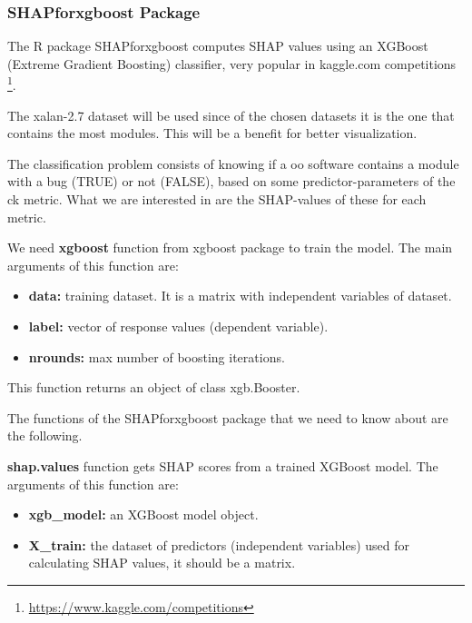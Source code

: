 \subsubsection{SHAPforxgboost Package}
\label{sec:shap-package}

The R package SHAPforxgboost computes SHAP values using an XGBoost (Extreme Gradient Boosting) classifier, very popular in kaggle.com competitions \footnote{\url{https://www.kaggle.com/competitions}}.

The xalan-2.7 dataset will be used since of the chosen datasets it is the one that contains the most modules. This will be a benefit for better visualization.

The classification problem consists of knowing if a \acrshort{oo} software contains a module with a bug (TRUE) or not (FALSE), based on some predictor-parameters of the \acrshort{ck} metric. What we are interested in are the SHAP-values of these for each metric.

We need \textbf{xgboost} function from xgboost package to train the model. The main arguments of this function are:

\begin{itemize}
    \item \textbf{data:} training dataset. It is a matrix with independent variables of dataset.
    
    \item \textbf{label:} vector of response values (dependent variable).
    
    \item \textbf{nrounds:} max number of boosting iterations.
\end{itemize}

This function returns an object of class xgb.Booster.

The functions of the SHAPforxgboost package that we need to know about are the following.

\textbf{shap.values} function gets SHAP scores from a trained XGBoost model. The arguments of this function are:

\begin{itemize}
    \item \textbf{xgb\_model:} an XGBoost model object.

    \item \textbf{X\_train:} the dataset of predictors (independent variables) used for calculating SHAP values, it should be a matrix.
\end{itemize}

